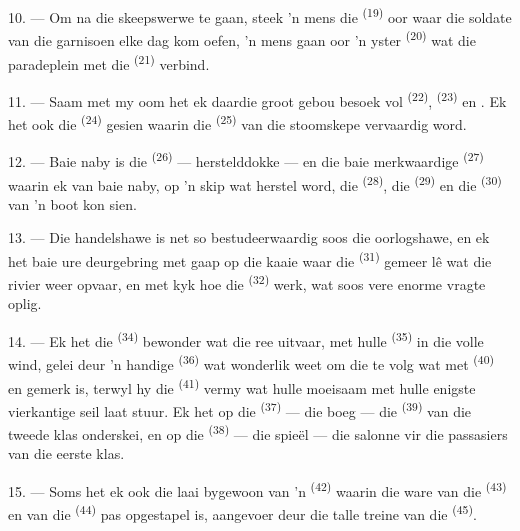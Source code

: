 10. --- Om na die skeepswerwe te gaan, steek 'n mens die 
\textsuperscript{(19)} oor waar die soldate van die garnisoen elke dag kom oefen, 'n mens
gaan oor 'n yster  \textsuperscript{(20)} wat die paradeplein met die
 \textsuperscript{(21)} verbind.

\VUsaut{3.0mm}
\VUsaut{3.0mm}

11. --- Saam met my oom het ek daardie groot gebou besoek vol 
\textsuperscript{(22)},  \textsuperscript{(23)} en . Ek
het ook die  \textsuperscript{(24)} gesien waarin die
 \textsuperscript{(25)} van die stoomskepe vervaardig word.

12. --- Baie naby is die  \textsuperscript{(26)} --- herstelddokke --- en
die baie merkwaardige  \textsuperscript{(27)} waarin ek van baie
naby, op 'n skip wat herstel word, die  \textsuperscript{(28)}, die
 \textsuperscript{(29)} en die  \textsuperscript{(30)} van 'n
boot kon sien.

13. --- Die handelshawe is net so bestudeerwaardig soos die oorlogshawe, en ek het baie
ure deurgebring met gaap op die kaaie waar die  \textsuperscript{(31)}
gemeer lê wat die rivier weer opvaar, en met kyk hoe die 
\textsuperscript{(32)} werk, wat soos vere enorme vragte oplig.

\VUsaut{4.0mm}
\VUsaut{3.0mm}

14. --- Ek het die  \textsuperscript{(34)} bewonder wat die
ree uitvaar, met hulle  \textsuperscript{(35)} in die volle wind, gelei deur
'n handige  \textsuperscript{(36)} wat wonderlik weet om die
 te volg wat met  \textsuperscript{(40)} en
 gemerk is, terwyl hy die  \textsuperscript{(41)} vermy
wat hulle moeisaam met hulle enigste vierkantige seil laat stuur. Ek het op die
 \textsuperscript{(37)} --- die boeg --- die 
\textsuperscript{(39)} van die tweede klas onderskei, en op die 
\textsuperscript{(38)} --- die spieël --- die salonne vir die passasiers van die eerste
klas.

15. --- Soms het ek ook die laai bygewoon van 'n 
\textsuperscript{(42)} waarin die ware van die  \textsuperscript{(43)} en
van die  \textsuperscript{(44)} pas opgestapel is, aangevoer deur die
talle treine van die  \textsuperscript{(45)}.

